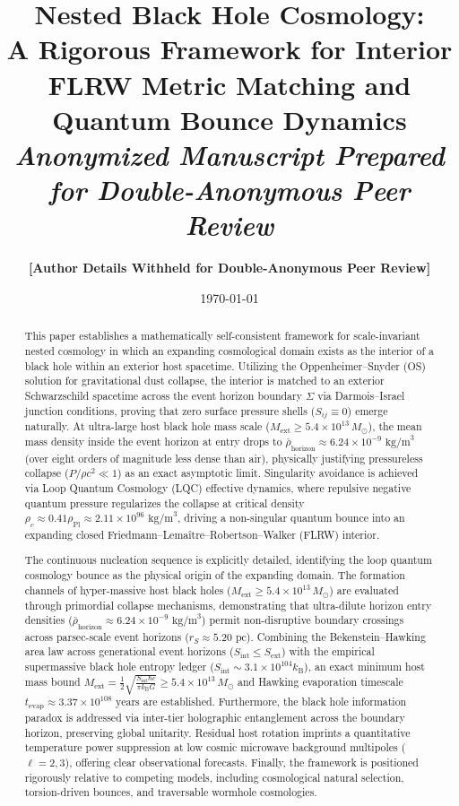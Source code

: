\documentclass[11pt,a4paper]{article}
\title{\textbf{Nested Black Hole Cosmology:\\A Rigorous Framework for Interior FLRW Metric Matching and Quantum Bounce Dynamics}\\[0.5em]
\large \textit{Anonymized Manuscript Prepared for Double-Anonymous Peer Review}}
\author{\textbf{[Author Details Withheld for Double-Anonymous Peer Review]}}
\date{\today}
\begin{document}
\maketitle

\begin{abstract}
\noindent This paper establishes a mathematically self-consistent framework for scale-invariant nested cosmology in which an expanding cosmological domain exists as the interior of a black hole within an exterior host spacetime. Utilizing the Oppenheimer--Snyder (OS) solution for gravitational dust collapse, the interior is matched to an exterior Schwarzschild spacetime across the event horizon boundary $\Sigma$ via Darmois--Israel junction conditions, proving that zero surface pressure shells ($S_{ij} \equiv 0$) emerge naturally. At ultra-large host black hole mass scale ($M_{\text{ext}} \ge 5.4 \times 10^{13} \, M_\odot$), the mean mass density inside the event horizon at entry drops to $\bar{\rho}_{\text{horizon}} \approx 6.24 \times 10^{-9} \text{ kg/m}^3$ (over eight orders of magnitude less dense than air), physically justifying pressureless collapse ($P/\rho c^2 \ll 1$) as an exact asymptotic limit. Singularity avoidance is achieved via Loop Quantum Cosmology (LQC) effective dynamics, where repulsive negative quantum pressure regularizes the collapse at critical density $\rho_c \approx 0.41 \rho_{\text{Pl}} \approx 2.11 \times 10^{96} \text{ kg/m}^3$, driving a non-singular quantum bounce into an expanding closed Friedmann--Lema\^{i}tre--Robertson--Walker (FLRW) interior.

The continuous nucleation sequence is explicitly detailed, identifying the loop quantum cosmology bounce as the physical origin of the expanding domain. The formation channels of hyper-massive host black holes ($M_{\text{ext}} \ge 5.4 \times 10^{13} \, M_\odot$) are evaluated through primordial collapse mechanisms, demonstrating that ultra-dilute horizon entry densities ($\bar{\rho}_{\text{horizon}} \approx 6.24 \times 10^{-9} \text{ kg/m}^3$) permit non-disruptive boundary crossings across parsec-scale event horizons ($r_S \approx 5.20 \text{ pc}$). Combining the Bekenstein--Hawking area law across generational event horizons ($S_{\text{int}} \le S_{\text{ext}}$) with the empirical supermassive black hole entropy ledger ($S_{\text{int}} \sim 3.1 \times 10^{104} k_{\text{B}}$), an exact minimum host mass bound $M_{\text{ext}} = \frac{1}{2}\sqrt{\frac{S_{\text{int}}\hbar c}{\pi k_{\text{B}} G}} \ge 5.4 \times 10^{13} \, M_\odot$ and Hawking evaporation timescale $t_{\text{evap}} \approx 3.37 \times 10^{108} \text{ years}$ are established. Furthermore, the black hole information paradox is addressed via inter-tier holographic entanglement across the boundary horizon, preserving global unitarity. Residual host rotation imprints a quantitative temperature power suppression at low cosmic microwave background multipoles ($\ell = 2,3$), offering clear observational forecasts. Finally, the framework is positioned rigorously relative to competing models, including cosmological natural selection, torsion-driven bounces, and traversable wormhole cosmologies.
\end{abstract}
\end{document}
